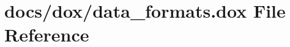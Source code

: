 \hypertarget{data__formats_8dox}{\section{docs/dox/data\+\_\+formats.dox File Reference}
\label{data__formats_8dox}
}
